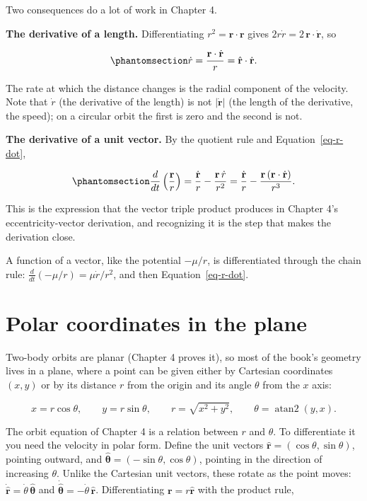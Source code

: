 \documentclass[
  10.5pt,
  letterpaper,
]{scrbook}
\theoremstyle{plain}
\theoremstyle{remark}
\begin{document}
Two consequences do a lot of work in Chapter 4.

\textbf{The derivative of a length.} Differentiating
\(r^2 = \mathbf{r}\cdot\mathbf{r}\) gives
\(2r\dot r = 2\,\mathbf{r}\cdot\dot{\mathbf{r}}\), so

\begin{equation}\protect\phantomsection\label{eq-r-dot}{
\dot r = \frac{\mathbf{r}\cdot\dot{\mathbf{r}}}{r} = \hat{\mathbf{r}}\cdot\dot{\mathbf{r}}.
}\end{equation}

The rate at which the distance changes is the radial component of the
velocity. Note that \(\dot r\) (the derivative of the length) is not
\(|\dot{\mathbf{r}}|\) (the length of the derivative, the speed); on a
circular orbit the first is zero and the second is not.

\textbf{The derivative of a unit vector.} By the quotient rule and
Equation~\ref{eq-r-dot},

\begin{equation}\protect\phantomsection\label{eq-unit-vector-dot}{
\frac{d}{dt}\left(\frac{\mathbf{r}}{r}\right) = \frac{\dot{\mathbf{r}}}{r} - \frac{\mathbf{r}\,\dot r}{r^2} = \frac{\dot{\mathbf{r}}}{r} - \frac{\mathbf{r}\,(\mathbf{r}\cdot\dot{\mathbf{r}})}{r^3}.
}\end{equation}

This is the expression that the vector triple product produces in
Chapter 4's eccentricity-vector derivation, and recognizing it is the
step that makes the derivation close.

A function of a vector, like the potential \(-\mu/r\), is differentiated
through the chain rule: \(\frac{d}{dt}(-\mu/r) = \mu\dot r/r^2\), and
then Equation~\ref{eq-r-dot}.

\section{Polar coordinates in the
plane}\label{polar-coordinates-in-the-plane}

Two-body orbits are planar (Chapter 4 proves it), so most of the book's
geometry lives in a plane, where a point can be given either by
Cartesian coordinates \((x, y)\) or by its distance \(r\) from the
origin and its angle \(\theta\) from the \(x\) axis:

\[
x = r\cos\theta, \qquad y = r\sin\theta, \qquad r = \sqrt{x^2+y^2}, \qquad \theta = \operatorname{atan2}(y, x).
\]

The orbit equation of Chapter 4 is a relation between \(r\) and
\(\theta\). To differentiate it you need the velocity in polar form.
Define the unit vectors \(\hat{\mathbf{r}} = (\cos\theta, \sin\theta)\),
pointing outward, and
\(\hat{\boldsymbol{\theta}} = (-\sin\theta, \cos\theta)\), pointing in
the direction of increasing \(\theta\). Unlike the Cartesian unit
vectors, these rotate as the point moves:
\(\dot{\hat{\mathbf{r}}} = \dot\theta\,\hat{\boldsymbol{\theta}}\) and
\(\dot{\hat{\boldsymbol{\theta}}} = -\dot\theta\,\hat{\mathbf{r}}\).
Differentiating \(\mathbf{r} = r\hat{\mathbf{r}}\) with the product
rule,
\end{document}

